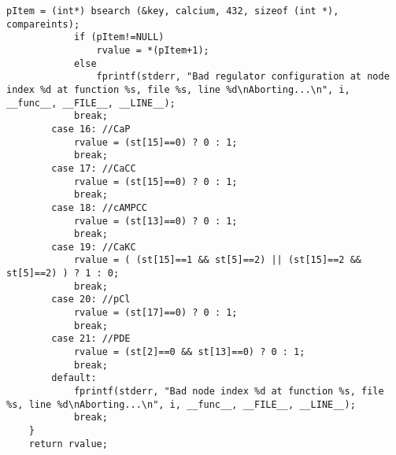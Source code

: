 \begin{lstlisting}[caption=Modelo discreto de la vía de señalización. Implementación en C]
			pItem = (int*) bsearch (&key, calcium, 432, sizeof (int *), compareints);
			if (pItem!=NULL)
				rvalue = *(pItem+1);
			else
				fprintf(stderr, "Bad regulator configuration at node index %d at function %s, file %s, line %d\nAborting...\n", i, __func__, __FILE__, __LINE__);
			break;
		case 16: //CaP
			rvalue = (st[15]==0) ? 0 : 1;
			break;
		case 17: //CaCC
			rvalue = (st[15]==0) ? 0 : 1;
			break;
		case 18: //cAMPCC
			rvalue = (st[13]==0) ? 0 : 1;
			break;
		case 19: //CaKC
			rvalue = ( (st[15]==1 && st[5]==2) || (st[15]==2 && st[5]==2) ) ? 1 : 0;
			break;
		case 20: //pCl
			rvalue = (st[17]==0) ? 0 : 1;
			break;
		case 21: //PDE
			rvalue = (st[2]==0 && st[13]==0) ? 0 : 1;
			break;
		default:
			fprintf(stderr, "Bad node index %d at function %s, file %s, line %d\nAborting...\n", i, __func__, __FILE__, __LINE__);
			break;
	}
	return rvalue;

\end{lstlisting}

%
%
%  
